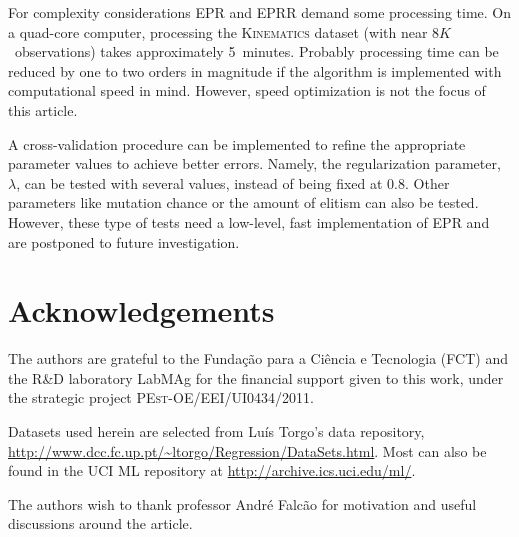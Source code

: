 \documentclass[review,preprint]{elsarticle}
\begin{document}
For complexity considerations \ac{EPR} and \ac{EPRR} demand some processing time. On a quad-core computer, processing the \textsc{Kinematics} dataset (with near $8K$~observations) takes approximately 5~minutes. Probably processing time can be reduced by one to two orders in magnitude if the algorithm is implemented with computational speed in mind. However, speed optimization is not the focus of this article.

A cross-validation procedure can be implemented to refine the appropriate parameter values to achieve better errors. Namely, the regularization parameter, $\lambda$, can be tested with several values, instead of being fixed at $0.8$. Other parameters like mutation chance or the amount of elitism can also be tested. However, these type of tests need a low-level, fast implementation of \ac{EPR} and are postponed to future investigation.

\section*{Acknowledgements}

The authors are grateful to the Fundação para a Ciência e Tecnologia (FCT) and the  R\&D laboratory LabMAg for the financial support given to this work, under the strategic project \textsc{PEst-OE/EEI/UI0434/2011}.

Datasets used herein are selected from Luís Torgo's data repository, \url{http://www.dcc.fc.up.pt/~ltorgo/Regression/DataSets.html}. Most can also be found in the UCI ML repository at \url{http://archive.ics.uci.edu/ml/}.

The authors wish to thank professor André Falcão for motivation and useful discussions around the article.



    
\end{document}
